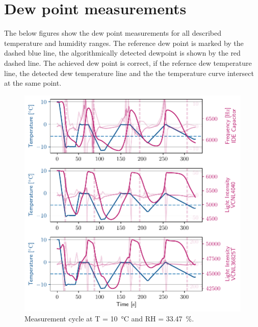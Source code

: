 
\appendix
\chapter{Dew point measurements}\label{appendix}
The below figures show the dew point measurements for all described temperature and humidity ranges. The reference dew point is marked by the dashed blue line, the algorithmically detected dewpoint is shown by the red dashed line. The achieved dew point is correct, if the refernce dew temperature line, the detected dew temperature line and the the temperature curve intersect at the same point.

\begin{figure}[ht]
    \centering
    \includegraphics{graphs/t10rh33.4.pdf}
    \caption{Measurement cycle at T = \qty{10}{\celsius} and RH = \qty{33.47}{\percent}.}
    
\end{figure}

